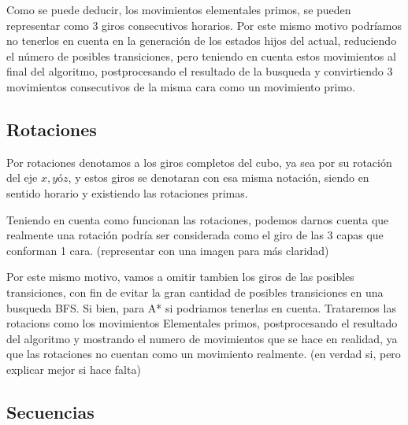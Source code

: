 \documentclass[11pt]{article}
\begin{document}
	Como se puede deducir, los movimientos elementales primos, se pueden representar como 3 giros consecutivos horarios. Por este mismo motivo podríamos no tenerlos en cuenta en la generación de los estados hijos del actual, reduciendo el número de posibles transiciones, pero teniendo en cuenta estos movimientos al final del algoritmo, postprocesando el resultado de la busqueda y convirtiendo 3 movimientos consecutivos de la misma cara como un movimiento primo.
\subsection{Rotaciones}
	Por rotaciones denotamos a los giros completos del cubo, ya sea por su rotación del eje $x, y $ó$ z$, y estos giros se denotaran con esa misma notación, siendo en sentido horario y existiendo las rotaciones primas. 

Teniendo en cuenta como funcionan las rotaciones, podemos darnos cuenta que realmente una rotación podría ser considerada como el giro de las 3 capas que conforman 1 cara. (representar con una imagen para más claridad)

Por este mismo motivo, vamos a  omitir tambien los giros de las posibles transiciones, con fin de evitar la gran cantidad de posibles transiciones en una busqueda BFS. Si bien, para A* si podriamos tenerlas en cuenta.
Trataremos las rotacions como los movimientos Elementales primos, postprocesando el resultado del algoritmo y mostrando el numero de movimientos que se hace en realidad, ya que las rotaciones no cuentan como un movimiento realmente. (en verdad si, pero explicar mejor si hace falta)

\subsection{Secuencias}
\end{document}

